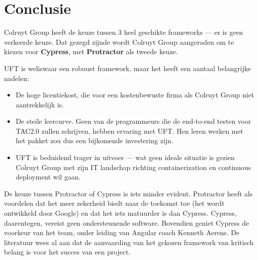 
\chapter{Conclusie}
\label{ch:conclusie}


Colruyt Group heeft de keuze tussen 3 heel geschikte frameworks — er is geen verkeerde keuze. Dat gezegd zijnde wordt Colruyt Group aangeraden om te kiezen voor \textbf{Cypress}, met \textbf{Protractor} als tweede keuze.

UFT is weliswaar een robuust framework, maar het heeft een aantaal belangrijke nadelen:

\begin{itemize}
    \item De hoge licentiekost, die voor een kostenbewuste firma als Colruyt Group niet aantrekkelijk is.
    \item De steile leercurve. Geen van de programmeurs die de end-to-end testen voor TAC2.0 zullen schrijven, hebben ervaring met UFT. Hen leren werken met het pakket zou dus een bijkomende investering zijn.
    \item UFT is beduidend trager in uitvoer — wat geen ideale situatie is gezien Colruyt Group met zijn IT landschap richting containerization en continuous deployment wil gaan.
\end{itemize}

De keuze tussen Protractor of Cypress is iets minder evident. Protractor heeft als voordelen dat het meer zekerheid biedt naar de toekomst toe (het wordt ontwikkeld door Google) en dat het iets matuurder is dan Cypress. Cypress, daarentegen, vereist geen ondersteunende software. Bovendien geniet Cypress de voorkeur van het team, onder leiding van Angular coach Kenneth Aerens. De literatuur wees al aan dat de aanvaarding van het gekozen framework van kritisch belang is voor het succes van een project.

